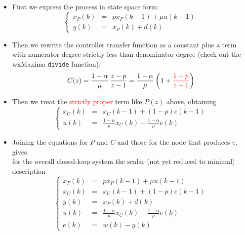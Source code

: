 \begin{frame}
\myPause
 \begin{itemize}[<+-| alert@+>]
 \item First we express the process in state space form:
       \begin{displaymath}
        \left\{\begin{array}{rcl}
         x_P(k) &=& p x_P(k-1) + \mu u(k-1) \\
         y(k)   &=& x_P(k) + d(k)
        \end{array}\right.
       \end{displaymath}
 \item Then we rewrite the controller transfer function as a constant plus a term with numerator degree
       strictly less than denominator degree (check out the wxMaxima \texttt{divide} function):
       \begin{displaymath}
        C(z) = \frac{1-\alpha}{\mu} \, \frac{z-p}{z-1} 
             = \frac{1-\alpha}{\mu} \left( 1 + \textcolor{red}{\frac{1-p}{z-1}} \right)
       \end{displaymath}
 \item Then we treat the \textcolor{red}{strictly proper} term like $P(z)$ above, obtaining
       \begin{displaymath}
        \left\{\begin{array}{rcl}
         x_C(k) &=& x_C(k-1) + (1-p) e(k-1) \\
         u(k)   &=& \frac{1-\alpha}{\mu} x_C(k) + \frac{1-\alpha}{\mu} e(k)
        \end{array}\right.
       \end{displaymath}
 \end{itemize}
\end{frame}

\begin{frame}
\myPause
 \begin{itemize}[<+-| alert@+>]
 \item Joining the equations for $P$ and $C$ and those for the node that produces $e$, gives\\
       for the overall closed-loop system the scalar (not yet reduced to minimal) description
       \begin{displaymath}
        \left\{\begin{array}{rcl}
         x_P(k) &=& p x_P(k-1) + \mu u(k-1) \\
         x_C(k) &=& x_C(k-1) + (1-p) e(k-1) \\
         y(k)   &=& x_P(k) + d(k) \\
         u(k)   &=& \frac{1-\alpha}{\mu} x_C(k) + \frac{1-\alpha}{\mu} e(k) \\
         e(k)   &=& w(k) - y(k)
        \end{array}\right.
       \end{displaymath}
 \end{itemize}
\end{frame}

